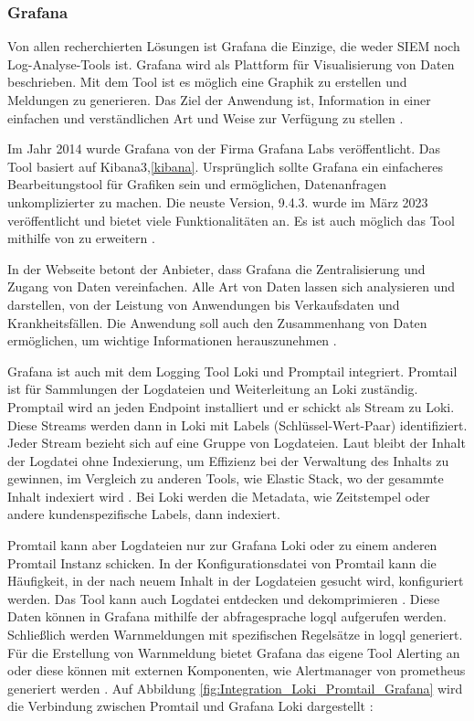 \subsubsection{Grafana}
Von allen recherchierten Lösungen ist Grafana die Einzige, die weder \gls{SIEM} noch Log-Analyse-Tools ist. Grafana wird als Plattform für Visualisierung von Daten beschrieben. Mit dem Tool ist es möglich eine Graphik zu erstellen und Meldungen zu generieren. Das Ziel der Anwendung ist, Information in einer einfachen und verständlichen Art und Weise zur Verfügung zu stellen \citep{redhat_grafana}.

Im Jahr 2014 wurde Grafana von der Firma Grafana Labs veröffentlicht. Das Tool basiert auf Kibana3,\ref{kibana}. Ursprünglich sollte Grafana ein einfacheres Bearbeitungstool für Grafiken sein und ermöglichen, Datenanfragen unkomplizierter zu machen. Die neuste Version, 9.4.3. wurde im März 2023 veröffentlicht und bietet viele Funktionalitäten an. Es ist auch möglich das Tool mithilfe von   zu erweitern \citep{Oedegaard_historyGrafana}.

In der Webseite betont der Anbieter, dass Grafana die Zentralisierung und Zugang von Daten vereinfachen. Alle Art von Daten lassen sich analysieren und darstellen, von der Leistung von Anwendungen bis Verkaufsdaten und Krankheitsfällen. Die Anwendung soll auch den Zusammenhang von Daten ermöglichen, um wichtige Informationen herauszunehmen \citep{Grafana_Grafana}.

Grafana ist auch mit dem Logging Tool Loki und Promptail integriert. Promtail ist für Sammlungen der Logdateien und Weiterleitung an Loki zuständig. Promptail wird an jeden \gls{Endpoint} installiert und er schickt als Stream zu Loki. Diese Streams werden dann in Loki mit Labels (Schlüssel-Wert-Paar) identifiziert. Jeder Stream bezieht sich auf eine Gruppe von Logdateien. Laut \cite{Grafana_fundamentals} bleibt der Inhalt der Logdatei ohne Indexierung, um Effizienz bei der Verwaltung des Inhalts zu gewinnen, im Vergleich zu anderen Tools, wie Elastic Stack, wo der gesammte Inhalt indexiert wird \citep{Anand_LokixELK}. Bei Loki werden die Metadata, wie Zeitstempel oder andere kundenspezifische Labels, dann indexiert.

Promtail kann aber Logdateien nur zur Grafana Loki oder zu einem anderen Promtail Instanz schicken. In der Konfigurationsdatei von Promtail kann die Häufigkeit, in der nach neuem Inhalt in der Logdateien gesucht wird, konfiguriert werden. Das Tool kann auch Logdatei entdecken und dekomprimieren \citep{Grafana_Promtail}. Diese Daten können in Grafana mithilfe der \gls{abfragesprache} \gls{logql} aufgerufen werden. Schließlich werden Warnmeldungen mit spezifischen Regelsätze in \gls{logql} generiert. Für die Erstellung von Warnmeldung bietet Grafana das eigene Tool Alerting an oder diese können mit externen Komponenten, wie Alertmanager von \gls{prometheus} generiert werden \citep{Grafana_loki}. Auf Abbildung \ref{fig:Integration_Loki_Promtail_Grafana} wird die Verbindung zwischen Promtail und Grafana Loki dargestellt \citep{Grafana_Logs}:

